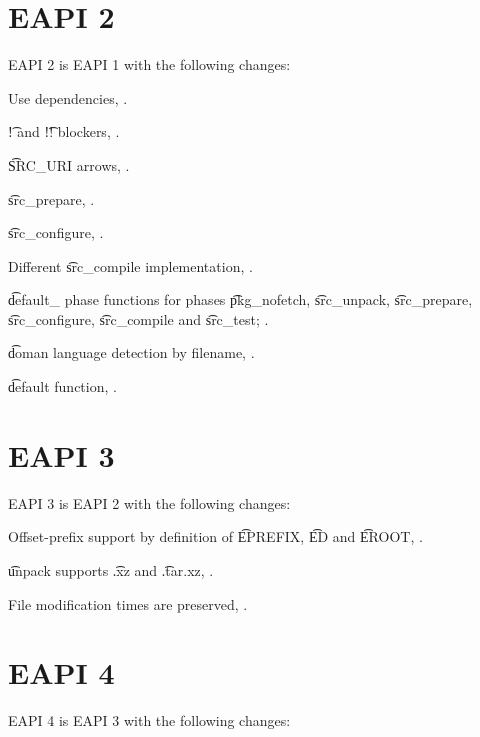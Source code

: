 \section*{EAPI 2}

EAPI 2 is EAPI 1 with the following changes:

\begin{compactitem}
\item Use dependencies, .
\item \t{!} and \t{!!} blockers, .
\item \t{SRC\_URI} arrows, .
\item \t{src\_prepare}, .
\item \t{src\_configure}, .
\item Different \t{src\_compile} implementation, .
\item \t{default\_} phase functions for phases \t{pkg\_nofetch}, \t{src\_unpack}, \t{src\_prepare},
    \t{src\_configure}, \t{src\_compile} and \t{src\_test}; .
\item \t{doman} language detection by filename, .
\item \t{default} function, .
\end{compactitem}

\section*{EAPI 3}

EAPI 3 is EAPI 2 with the following changes:
\begin{compactitem}
\item Offset-prefix support by definition of \t{EPREFIX}, \t{ED} and \t{EROOT},
    .
\item \t{unpack} supports \t{.xz} and \t{.tar.xz}, .
\item File modification times are preserved, .
\end{compactitem}

\section*{EAPI 4}

EAPI 4 is EAPI 3 with the following changes:

